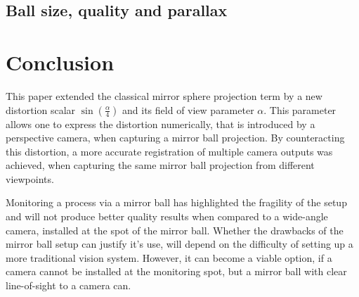 \documentclass[10pt]{article}
\begin{document}
\begin{multicols}{2}
	\subsection{Ball size, quality and parallax}
	\begin{figure}[H]
		\hfill
	\end{figure}

	\section{Conclusion}
	This paper extended the classical mirror sphere projection term by a new distortion scalar $\sin{\left(\frac{\alpha}{4}\right)}$ and its field of view parameter $\alpha$. This parameter allows one to express the distortion numerically, that is introduced by a perspective camera, when capturing a mirror ball projection. By counteracting this distortion, a more accurate registration of multiple camera outputs was achieved, when capturing the same mirror ball projection from different viewpoints.

	Monitoring a process via a mirror ball has highlighted the fragility of the setup and will not produce better quality results when compared to a wide-angle camera, installed at the spot of the mirror ball. Whether the drawbacks of the mirror ball setup can justify it's use, will depend on the difficulty of setting up a more traditional vision system. However, it can become a viable option, if a camera cannot be installed at the monitoring spot, but a mirror ball with clear line-of-sight to a camera can.

	
\end{multicols}
\end{document}
